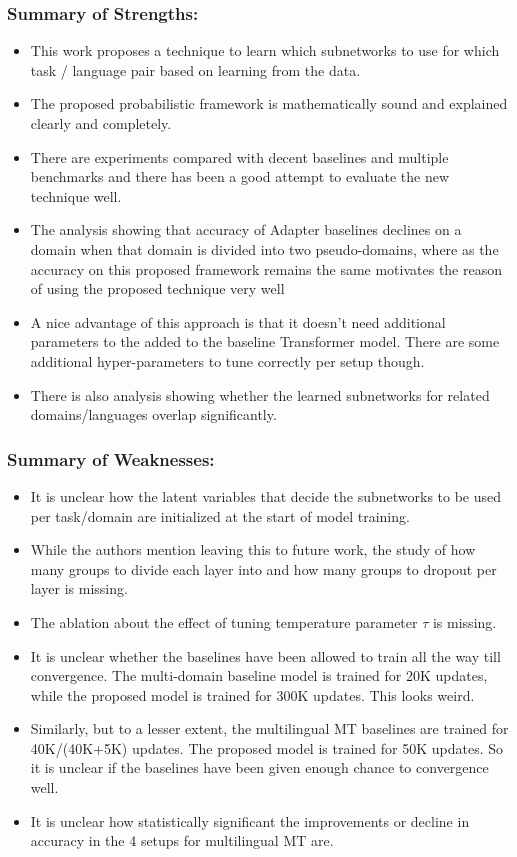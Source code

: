 \documentclass[12pt,times,a4paper,twoside]{article}
\theoremstyle{definition}
\begin{document}
\subsubsection*{Summary of Strengths:}

\begin{itemize}
\item This work proposes a technique to learn which subnetworks to use for which task / language pair based on learning from the data.
\item The proposed probabilistic framework is mathematically sound and explained clearly and completely.
\item There are experiments compared with decent baselines and multiple benchmarks and there has been a good attempt to evaluate the new technique well.
\item The analysis showing that accuracy of Adapter baselines declines on a domain when that domain is divided into two pseudo-domains, where as the accuracy on this proposed framework remains the same motivates the reason of using the proposed technique very well
\item A nice advantage of this approach is that it doesn’t need additional parameters to the added to the baseline Transformer model. There are some additional hyper-parameters to tune correctly per setup though.
\item There is also analysis showing whether the learned subnetworks for related domains/languages overlap significantly.

\end{itemize}

\subsubsection*{Summary of Weaknesses:}

\begin{itemize}
\item It is unclear how the latent variables that decide the subnetworks to be used per task/domain are initialized at the start of model training.
\item While the authors mention leaving this to future work, the study of how many groups to divide each layer into and how many groups to dropout per layer is missing.
\item The ablation about the effect of tuning temperature parameter $\tau$ is missing.
\item It is unclear whether the baselines have been allowed to train all the way till convergence. The multi-domain baseline model is trained for 20K updates, while the proposed model is trained for 300K updates. This looks weird.
\item Similarly, but to a lesser extent, the multilingual MT baselines are trained for 40K/(40K+5K) updates. The proposed model is trained for 50K updates. So it is unclear if the baselines have been given enough chance to convergence well.
\item It is unclear how statistically significant the improvements or decline in accuracy in the 4 setups for multilingual MT are.
\end{itemize}
\end{document}

